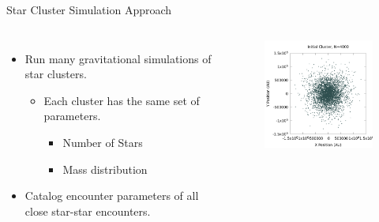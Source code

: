 \documentclass{beamer}
\begin{document}
\begin{frame}{Star Cluster Simulation Approach}
    \begin{columns}
        \begin{itemize}
            \item Run many gravitational simulations of star clusters.
                \begin{itemize}
                    \item Each cluster has the same set of parameters.
                    \begin{itemize}
                        \item Number of Stars
                        \item Mass distribution
                    \end{itemize}
                \end{itemize}
            \item Catalog encounter parameters of all close star-star encounters.
        \end{itemize}
        \begin{figure}
            \centering
            \includegraphics[width=2.25in]{slides/cluster_n4000.png}
        \end{figure}
    \end{columns}
\end{frame}
\end{document}
